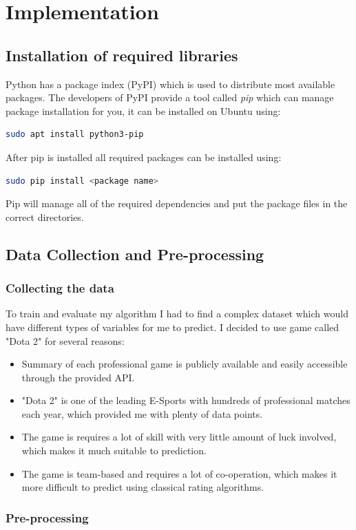 \documentclass[12pt,a4paper]{book}
\begin{document}
\chapter{Implementation}
\section{Installation of required libraries}
Python has a package index (PyPI) which is used to distribute most available packages.
The developers of PyPI provide a tool called \emph{pip} which can manage package installation for you, it can be installed on Ubuntu using:
\begin{lstlisting}[language=bash,backgroundcolor = \color{lightgray}]
sudo apt install python3-pip
\end{lstlisting}
After pip is installed all required packages can be installed using:
\begin{lstlisting}[language=bash, backgroundcolor = \color{lightgray}]
sudo pip install <package name>
\end{lstlisting}
Pip will manage all of the required dependencies and put the package files in the correct directories.
\section{Data Collection and Pre-processing}
\subsection{Collecting the data}
To train and evaluate my algorithm I had to find a complex dataset which would have different types of variables for me to predict.
I decided to use game called "Dota 2" for several reasons:
\begin{itemize}
\item Summary of each professional game is publicly available and easily accessible through the provided API.
\item "Dota 2" is one of the leading E-Sports with hundreds of professional matches each year, which provided me with plenty of data points.
\item The game is requires a lot of skill with very little amount of luck involved, which makes it much suitable to prediction.
\item The game is team-based and requires a lot of co-operation, which makes it more difficult to predict using classical rating algorithms.
\end{itemize}
\subsection{Pre-processing}
\end{document}
